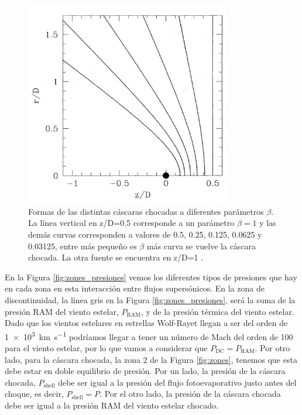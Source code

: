 \documentclass{book}
\begin{document}
\begin{figure}[htb]
    \centering    \includegraphics[width=0.8\textwidth]{images Chapter 2/C2_Canto2.jpg}
    \caption{Formas de las distintas cáscaras chocadas a diferentes
      parámetros $\beta$. La línea vertical en z/D=0.5 corresponde a un
      parámetro $\beta=1$ y las demás curvas corresponden a valores de
      0.5, 0.25, 0.125, 0.0625 y 0.03125, entre más pequeño es $\beta$ más
      curva se vuelve la cáscara chocada. La otra fuente se encuentra
      en z/D=1 \citep{Canto:1996}.}
    \label{fig:Canto2}
\end{figure}

En la Figura \ref{fig:zones_presiones} vemos los diferentes tipos de
presiones que hay en cada zona en esta interacción entre flujos
supersónicos. En la zona de discontinuidad, la línea gris en la Figura
\ref{fig:zones_presiones}, será la suma de la presión RAM del viento
estelar, $P_\mathrm{RAM}$, y de la presión térmica del viento estelar.
Dado que los vientos estelares en estrellas Wolf-Rayet llegan a ser
del orden de \SI{1e3}{km.s^{-1}} podríamos llegar a tener un número de
Mach del orden de 100 para el viento estelar, por lo que vamos a
considerar que $P_\mathrm{DC}=P_\mathrm{RAM}$. Por otro lado, para la
cáscara chocada, la zona 2 de la Figura \ref{fig:zones}, tenemos que
esta debe estar en doble equilibrio de presión. Por un lado, la
presión de la cáscara chocada, $P_\mathrm{shell}$ debe ser igual a la
presión del flujo fotoevaporativo justo antes del choque, es decir,
$P_\mathrm{shell}=P$. Por el otro lado, la presión de la cáscara
chocada debe ser igual a la presión RAM del viento estelar chocado.
\end{document}
